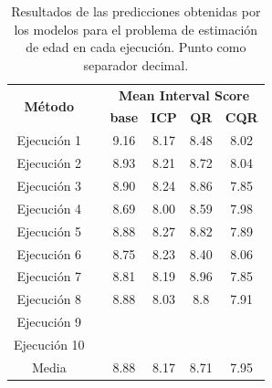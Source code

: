\renewcommand{\arraystretch}{1.5}
\begin{table}[h]
    \small \centering
    \begin{tabular}{cccccc}
    \toprule
    \multirow{2}{*}{\textbf{Método}} &  & \multicolumn{4}{c}{\textbf{Mean Interval Score}}          \\ \cline{3-6} 
                                     &  & \textbf{base}  & \textbf{ICP}  & \textbf{QR}   & \textbf{CQR} \\ \cline{1-1} \cline{3-6} 
    Ejecución 1                      &  & 9.16           & 8.17          & 8.48          & 8.02         \\
    Ejecución 2                      &  & 8.93           & 8.21          & 8.72          & 8.04         \\
    Ejecución 3                      &  & 8.90           & 8.24          & 8.86          & 7.85         \\
    Ejecución 4                      &  & 8.69           & 8.00          & 8.59          & 7.98         \\
    Ejecución 5                      &  & 8.88           & 8.27          & 8.82          & 7.89         \\
    Ejecución 6                      &  & 8.75           & 8.23          & 8.40          & 8.06         \\
    Ejecución 7                      &  & 8.81           & 8.19          & 8.96          & 7.85         \\
    Ejecución 8                      &  & 8.88           & 8.03          & 8.8           & 7.91         \\
    Ejecución 9                      &  &                &               &               &              \\
    Ejecución 10                     &  &                &               &               &              \\ \cline{1-1} \cline{3-6} 
    Media                            &  & 8.88           & 8.17          & 8.71          & 7.95         \\ 
    \bottomrule
    \end{tabular}
    \caption[
        Resultados de las predicciones obtenidas por los modelos para el problema de estimación de edad en cada 
        ejecución.
    ]{   
        Resultados de las predicciones obtenidas por los modelos para el problema de estimación de edad en cada 
        ejecución.
        Punto como separador decimal.
    }
    \label{tab:AE_MIS_comparative}
\end{table}


